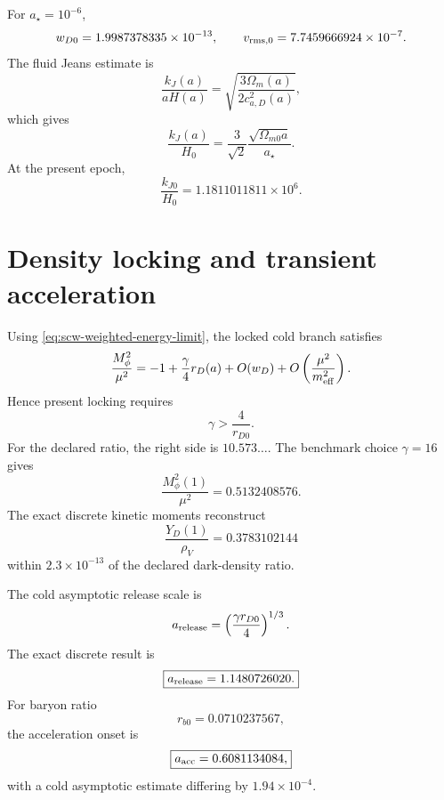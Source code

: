 For $a_\star=10^{-6}$,
\begin{equation}
 w_{D0}=1.9987378335\times10^{-13},
 \qquad
 v_{\rm rms,0}=7.7459666924\times10^{-7}.
 \label{eq:scw-benchmark-coldness}
\end{equation}
The fluid Jeans estimate is
\begin{equation}
 \frac{k_J(a)}{aH(a)}
 =\sqrt{\frac{3\Omega_m(a)}{2c_{a,D}^2(a)}},
 \label{eq:scw-jeans-definition}
\end{equation}
which gives
\begin{equation}
 \boxed{
 \frac{k_J(a)}{H_0}
 =\frac{3}{\sqrt2}
 \frac{\sqrt{\Omega_{m0}a}}{a_\star}.}
 \label{eq:scw-jeans-law}
\end{equation}
At the present epoch,
\begin{equation}
 \frac{k_{J0}}{H_0}=1.1811011811\times10^6.
 \label{eq:scw-benchmark-jeans}
\end{equation}

\section{Density locking and transient acceleration}

Using \eqref{eq:scw-weighted-energy-limit}, the locked cold branch satisfies
\begin{equation}
 \frac{M_\phi^2}{\mu^2}
 =-1+\frac{\gamma}{4}r_D(a)
 +O(w_D)+O\left(\frac{\mu^2}{m_{\rm eff}^2}\right).
 \label{eq:scw-lock-density-law}
\end{equation}
Hence present locking requires
\begin{equation}
 \boxed{
 \gamma>\frac{4}{r_{D0}}.}
 \label{eq:scw-gamma-lock}
\end{equation}
For the declared ratio, the right side is $10.573\ldots$.  The benchmark choice $\gamma=16$ gives
\begin{equation}
 \boxed{
 \frac{M_\phi^2(1)}{\mu^2}=0.5132408576.}
 \label{eq:scw-present-lock-curvature}
\end{equation}
The exact discrete kinetic moments reconstruct
\begin{equation}
 \frac{Y_D(1)}{\rho_V}=0.3783102144
 \label{eq:scw-weighted-source-numeric}
\end{equation}
within $2.3\times10^{-13}$ of the declared dark-density ratio.

The cold asymptotic release scale is
\begin{equation}
 a_{\rm release}
 =\left(\frac{\gamma r_{D0}}4\right)^{1/3}.
 \label{eq:scw-release-law}
\end{equation}
The exact discrete result is
\begin{equation}
 \boxed{
 a_{\rm release}=1.1480726020.}
 \label{eq:scw-release-numeric}
\end{equation}
For baryon ratio
\begin{equation}
 r_{b0}=0.0710237567,
 \label{eq:scw-rb-benchmark}
\end{equation}
the acceleration onset is
\begin{equation}
 \boxed{
 a_{\rm acc}=0.6081134084,}
 \label{eq:scw-acceleration-numeric}
\end{equation}
with a cold asymptotic estimate differing by $1.94\times10^{-4}$.

